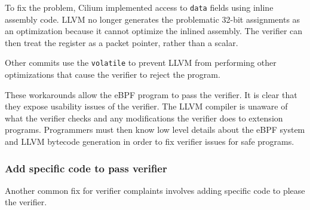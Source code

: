 
To fix the problem, Cilium implemented access to \texttt{data} fields using inline assembly code. %
LLVM no longer generates the problematic 32-bit assignments as an optimization because it cannot optimize the
    inlined assembly.
The verifier can then treat the register as a packet pointer, rather than a scalar.

Other commits use the \texttt{volatile} to prevent LLVM from performing other optimizations
    that cause the verifier to reject the program.

These workarounds allow the eBPF program to pass the verifier.
It is clear that they expose usability issues of the verifier.
The LLVM compiler is unaware of what the verifier checks and any modifications the verifier does to extension programs.
Programmers must then know low level details about the eBPF system and LLVM bytecode generation in order to fix verifier issues for safe programs.


%    

%    



\subsubsection{Add specific code to pass verifier}
\label{motivation:add-code}
Another common fix for verifier complaints involves adding specific code to please
    the verifier.

%

